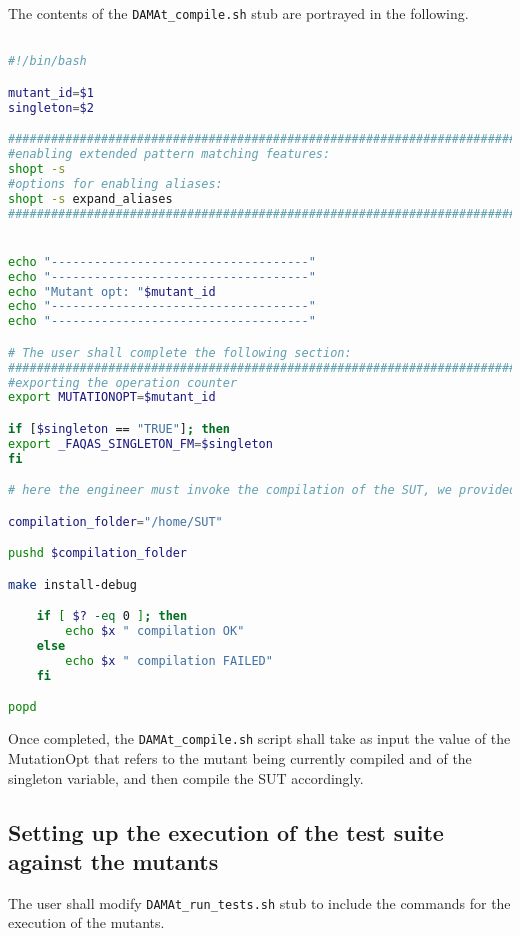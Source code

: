 The contents of the \texttt{DAMAt\_compile.sh} stub are portrayed in the following.

\begin{lstlisting}[label={lst:compile},language=bash]

#!/bin/bash

mutant_id=$1
singleton=$2

###############################################################################
#enabling extended pattern matching features:
shopt -s
#options for enabling aliases:
shopt -s expand_aliases
###############################################################################


echo "------------------------------------"
echo "------------------------------------"
echo "Mutant opt: "$mutant_id
echo "------------------------------------"
echo "------------------------------------"

# The user shall complete the following section:
###############################################################################
#exporting the operation counter
export MUTATIONOPT=$mutant_id

if [$singleton == "TRUE"]; then
export _FAQAS_SINGLETON_FM=$singleton
fi

# here the engineer must invoke the compilation of the SUT, we provided a simple example.

compilation_folder="/home/SUT"

pushd $compilation_folder

make install-debug

    if [ $? -eq 0 ]; then
        echo $x " compilation OK"
    else
        echo $x " compilation FAILED"
    fi

popd


\end{lstlisting}

Once completed, the \texttt{DAMAt\_compile.sh} script shall take as input the value of the MutationOpt that refers to the mutant being currently compiled and of the singleton variable, and then compile the SUT accordingly.

\subsection{Setting up the execution of the test suite against the mutants}

The user shall modify \texttt{DAMAt\_run\_tests.sh} stub to include the commands for the execution of the mutants.

